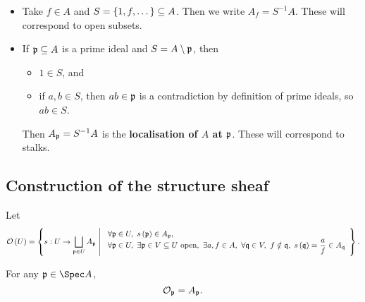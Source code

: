 \begin{example*}
\hfill
\begin{itemize}
\item Take $ f \in A $ and $ S = \cbr{1, f, \dots} \subseteq A $. Then we write $ A_f = S^{-1}A $. These will correspond to open subsets.
\item If $ \mathfrak{p} \subseteq A $ is a prime ideal and $ S = A \setminus \mathfrak{p} $, then
\begin{itemize}
\item $ 1 \in S $, and
\item if $ a, b \in S $, then $ ab \in \mathfrak{p} $ is a contradiction by definition of prime ideals, so $ ab \in S $.
\end{itemize}
Then $ A_{\mathfrak{p}} = S^{-1}A $ is the \textbf{localisation of $ A $ at $ \mathfrak{p} $}. These will correspond to stalks.
\end{itemize}
\end{example*}

\subsection{Construction of the structure sheaf}

Let
$$ \OOO\br{U} = \cbr{s : U \to \bigsqcup_{\ppp \in U} A_\ppp \st \begin{array}{l} \forall \ppp \in U, \ s\br{\ppp} \in A_\ppp, \\ \forall \ppp \in U, \ \exists \ppp \in V \subseteq U \ \text{open}, \ \exists a, f \in A, \ \forall \qqq \in V, \ f \notin \qqq, \ s\br{\qqq} = \dfrac{a}{f} \in A_\qqq \end{array}}. $$

\begin{proposition}
For any $ \ppp \in \Spec A $,
$$ \mathcal{O}_{\mathfrak{p}} = A_{\mathfrak{p}}. $$
\end{proposition}

